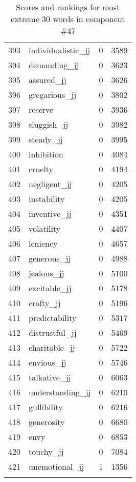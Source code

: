 \begin{longtable}[!htbp]{| rlr@{.}l |}
    393 & individualistic\_jj & 0 & 3589 \\
    394 & demanding\_jj & 0 & 3623 \\
    395 & assured\_jj & 0 & 3626 \\
    396 & gregarious\_jj & 0 & 3802 \\
    397 & reserve & 0 & 3936 \\
    398 & sluggish\_jj & 0 & 3982 \\
    399 & steady\_jj & 0 & 3995 \\
    400 & inhibition & 0 & 4084 \\
    401 & cruelty & 0 & 4194 \\
    402 & negligent\_jj & 0 & 4205 \\
    403 & instability & 0 & 4205 \\
    404 & inventive\_jj & 0 & 4351 \\
    405 & volatility & 0 & 4407 \\
    406 & leniency & 0 & 4657 \\
    407 & generous\_jj & 0 & 4988 \\
    408 & jealous\_jj & 0 & 5100 \\
    409 & excitable\_jj & 0 & 5178 \\
    410 & crafty\_jj & 0 & 5196 \\
    411 & predictability & 0 & 5317 \\
    412 & distrustful\_jj & 0 & 5469 \\
    413 & charitable\_jj & 0 & 5722 \\
    414 & envious\_jj & 0 & 5746 \\
    415 & talkative\_jj & 0 & 6063 \\
    416 & understanding\_jj & 0 & 6210 \\
    417 & gullibility & 0 & 6216 \\
    418 & generosity & 0 & 6680 \\
    419 & envy & 0 & 6853 \\
    420 & touchy\_jj & 0 & 7084 \\
    421 & unemotional\_jj & 1 & 1356 \\
    \hline
    \caption{Scores and rankings for most extreme 30 words in component \#47} \\
\end{longtable}
